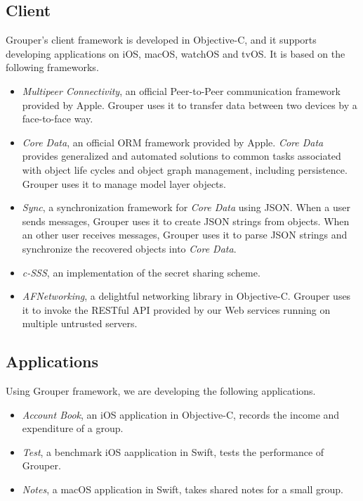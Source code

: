 \documentclass[twocolumn,10pt]{article}
\begin{document}
\subsection{Client}

Grouper's client framework is developed in Objective-C, and it supports developing applications on iOS, macOS, watchOS and tvOS.
It is based on the following frameworks.   

\begin{itemize}
	\setlength{\itemsep}{1pt}
	\setlength{\parskip}{0pt}
	\setlength{\parsep}{0pt}
	\item 
	\emph{Multipeer Connectivity}\cite{mc},  an official Peer-to-Peer communication framework provided by Apple. 
	Grouper uses it to transfer data between two devices by a face-to-face way.
	\item 
	\emph{Core Data}\cite{coredata}, an official ORM framework provided by Apple.
	\emph{Core Data} provides generalized and automated solutions to common tasks associated with object life cycles and object graph management, including persistence. 
	Grouper uses it to manage model layer objects. 
	\item 
	\emph{Sync}\cite{sync}, a synchronization framework for \emph{Core Data} using JSON. 
	When a user sends messages, Grouper uses it to create JSON strings from objects. 
	When an other user receives messages, Grouper uses it to parse JSON strings and synchronize the recovered objects into \emph{Core Data}.
	\item 
	\emph{c-SSS}\cite{c-sss}, an implementation of the secret sharing scheme.
	\item 
	\emph{AFNetworking}\cite{afnetworking}, a delightful networking library in Objective-C. 
	Grouper uses it to invoke the RESTful API provided by our Web services running on multiple untrusted servers. 
\end{itemize}

\subsection{Applications}

Using Grouper framework, we are developing the following applications. 

\begin{itemize}
	\setlength{\itemsep}{1pt}
	\setlength{\parskip}{0pt}
	\setlength{\parsep}{0pt}
	\item \emph{Account Book}, an iOS application in Objective-C, records the income and expenditure of a group.
	\item \emph{Test}, a benchmark iOS aapplication in Swift, tests the performance of Grouper.
	\item \emph{Notes}, a macOS application in Swift, takes shared notes for a small group.
\end{itemize}
\end{document}

